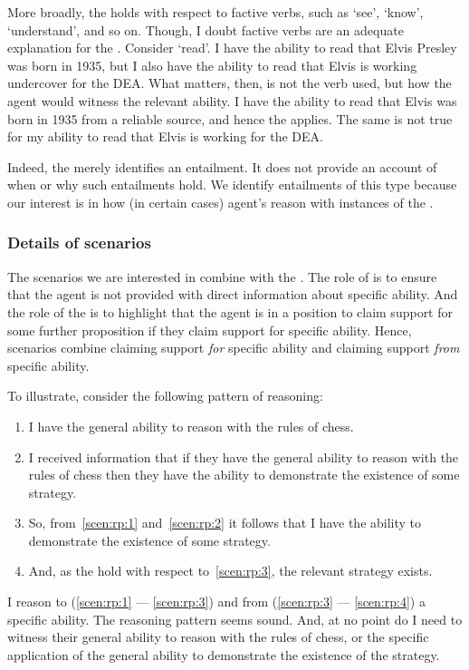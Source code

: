 \begin{note}[\aben{}]
  More broadly, the \aben{} holds with respect to factive verbs, such as `see', `know', `understand', and so on.
  Though, I doubt factive verbs are an adequate explanation for the \aben{}.
  Consider `read'.
  I have the ability to read that Elvis Presley was born in 1935, but I also have the ability to read that Elvis is working undercover for the DEA.
  What matters, then, is not the verb used, but how the agent would witness the relevant ability.
  I have the ability to read that Elvis was born in 1935 from a reliable source, and hence the \aben{} applies.
  The same is not true for my ability to read that Elvis is working for the DEA.

  Indeed, the \aben{} merely identifies an entailment.
  It does not provide an account of when or why such entailments hold.
  We identify entailments of this type because our interest is in how (in certain cases) agent's reason with instances of the \aben{}.
\end{note}

\subsubsection{Details of scenarios}
\label{sec:scenarios}

\begin{note}
  The scenarios we are interested in combine \gsi{} with the \aben{}.
  The role of \gsi{} is to ensure that the agent is not provided with direct information about specific ability.
  And the role of the \aben{} is to highlight that the agent is in a position to claim support for some further proposition if they claim support for specific ability.
  Hence, scenarios combine claiming support \emph{for} specific ability and claiming support \emph{from} specific ability.

  To illustrate, consider the following pattern of reasoning:
  \begin{enumerate}[label=\arabic*., ref=(\arabic*)]
  \item\label{scen:rp:1} I have the general ability to reason with the rules of chess.
  \item\label{scen:rp:2} I received \gsi{} information that if they have the general ability to reason with the rules of chess then they have the ability to demonstrate the existence of some strategy.
  \item\label{scen:rp:3} So, from~\ref{scen:rp:1} and~\ref{scen:rp:2} it follows that I have the ability to demonstrate the existence of some strategy.
  \item\label{scen:rp:4} And, as the \aben{} hold with respect to~\ref{scen:rp:3}, the relevant strategy exists.
  \end{enumerate}
  I reason to (\ref{scen:rp:1} --- \ref{scen:rp:3}) and from (\ref{scen:rp:3} --- \ref{scen:rp:4}) a specific ability.
  The reasoning pattern seems sound.
  And, at no point do I need to witness their general ability to reason with the rules of chess, or the specific application of the general ability to demonstrate the existence of the strategy.
\end{note}

